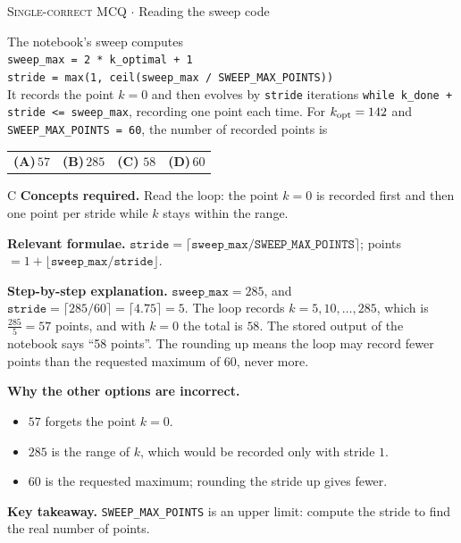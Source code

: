 \documentclass[11pt,a4paper]{article}
\newcommand{\optlabel}[1]{\textbf{(#1)}}
\newcommand{\correctlabel}[1]{\textcolor{okgreen}{\textbf{(#1)}\,\ding{51}}}
\newenvironment{qitem}[1]{\begin{list}{}{\setlength{\leftmargin}{3.3em}\setlength{\labelwidth}{3.1em}%
  \setlength{\labelsep}{0.2em}\setlength{\topsep}{3pt}\setlength{\parsep}{3pt}}\item[\textbf{Q.#1}\hfill]}{\end{list}}
\newcommand{\qsep}{\par\vspace{2pt}{\color{black!15}\hrule}\vspace{4pt}}
\newcommand{\qmeta}[2]{{\footnotesize\color{black!60}\textsc{#1} \;$\cdot$\; #2}\par}
\begin{document}
\begin{qitem}{72}
\qmeta{Single-correct MCQ}{Reading the sweep code}
The notebook's sweep computes\\
\hspace*{1em}\texttt{sweep\_max = 2 * k\_optimal + 1}\\
\hspace*{1em}\texttt{stride = max(1, ceil(sweep\_max / SWEEP\_MAX\_POINTS))}\\
It records the point $k = 0$ and then evolves by \texttt{stride} iterations \texttt{while k\_done + stride <= sweep\_max}, recording one point each time. For $k_{\rm opt} = 142$ and \texttt{SWEEP\_MAX\_POINTS = 60}, the number of recorded points is
\par\smallskip\noindent\begin{tabularx}{\linewidth}{@{}*{4}{L}@{}}
\optlabel{A}\,$57$ & \optlabel{B}\,$285$ & \correctlabel{C}\,$58$ & \optlabel{D}\,$60$
\end{tabularx}
\end{qitem}
\begin{solbox}{C}
\textbf{\color{brand}Concepts required.} Read the loop: the point $k = 0$ is recorded first and then one point per stride while $k$ stays within the range.

\textbf{\color{brand}Relevant formulae.} $\texttt{stride} = \lceil\texttt{sweep\_max}/\texttt{SWEEP\_MAX\_POINTS}\rceil$; points $= 1 + \lfloor\texttt{sweep\_max}/\texttt{stride}\rfloor$.

\textbf{\color{brand}Step-by-step explanation.} $\texttt{sweep\_max} = 285$, and $\texttt{stride} = \lceil 285/60\rceil = \lceil 4.75\rceil = 5$. The loop records $k = 5, 10, \dots, 285$, which is $\frac{285}{5} = 57$ points, and with $k = 0$ the total is $58$. The stored output of the notebook says ``58 points''.
The rounding up means the loop may record fewer points than the requested maximum of $60$, never more.

\textbf{\color{brand}Why the other options are incorrect.}
\begin{itemize}[leftmargin=2.4em, itemsep=1pt, topsep=2pt]
\item[\textbf{(A)}] $57$ forgets the point $k = 0$.
\item[\textbf{(B)}] $285$ is the range of $k$, which would be recorded only with stride $1$.
\item[\textbf{(D)}] $60$ is the requested maximum; rounding the stride up gives fewer.
\end{itemize}
\textbf{\color{brand}Key takeaway.} \texttt{SWEEP\_MAX\_POINTS} is an upper limit: compute the stride to find the real number of points.
\end{solbox}
\qsep
\end{document}
